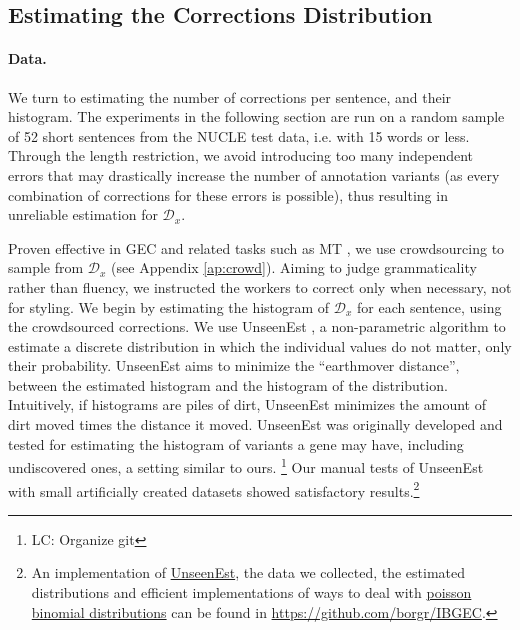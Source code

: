 \documentclass[11pt, a4paper]{article}
\newcommand{\lc}[1]{\footnote{\color{blue}LC: #1}}
\begin{document}
\subsection{Estimating the Corrections Distribution}\label{subsec:corrections_distribution}
%
\paragraph{Data.}
We turn to estimating the number of corrections per sentence, and their histogram.
The experiments in the following section are run on a random sample of 52 short sentences from the NUCLE test data, i.e. with 15 words or less. Through the length restriction, we avoid introducing too many independent errors that may drastically increase the number of annotation variants (as every combination of corrections for these errors is possible), thus resulting in unreliable estimation for $\mathcal{D}_x$. 

Proven effective in GEC and related tasks such as MT \cite{zaidan2011crowdsourcing,madnani2011they,post2012constructing}, 
we use crowdsourcing to sample from $\mathcal{D}_x$ (see Appendix  \ref{ap:crowd}).
Aiming to judge grammaticality rather than fluency, we instructed the workers to correct only when necessary, not for styling.
We begin by estimating the histogram of $\mathcal{D}_x$ for each sentence, using the crowdsourced corrections.
We use {\sc UnseenEst} \cite{zou2015quantifying}, a non-parametric algorithm to
estimate a discrete distribution in which the individual values do not matter, only their probability. 
{\sc UnseenEst} aims to minimize the ``earthmover distance'', between the estimated histogram and the histogram of the distribution. 
Intuitively, if histograms are piles of dirt, {\sc UnseenEst} minimizes the amount of dirt moved times the distance it moved.
{\sc UnseenEst} was originally developed and tested for estimating the histogram of
variants a gene may have, including undiscovered ones, a setting similar to ours.
\lc{Organize git}
Our manual tests of {\sc UnseenEst} with small artificially created datasets
showed satisfactory results.\footnote{An implementation of \href{https://github.com/borgr/unseenest}{\sc UnseenEst}, the data we collected, the estimated distributions and efficient implementations of ways to deal with \href{https://github.com/borgr/PoissonBinomial}{poisson binomial distributions} can be found in \url{https://github.com/borgr/IBGEC}.}
\end{document}
